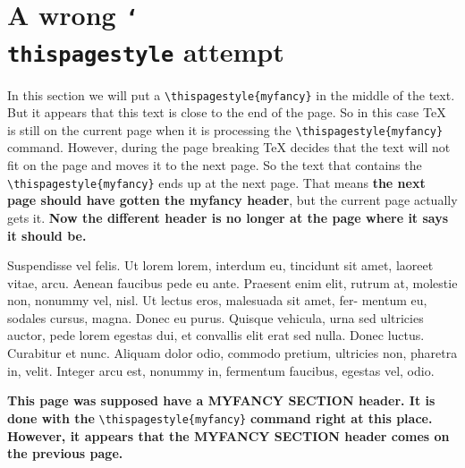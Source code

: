 \documentclass[openany]{book}
\newcommand{\cs}[1]{\texttt{\char`\\#1}}
\begin{document}
\bigskip

\lipsum[1-3]
\lipsum[3-5]

\newpage

\section{A wrong \cs{thispagestyle} attempt}

\begin{boxedminipage}{\textwidth}
In this section we will put a \verb|\thispagestyle{myfancy}| in the middle of the text. But it appears that this text is close to the end of the page. So in this case \TeX{} is still on the current page when it is processing the \verb|\thispagestyle{myfancy}| command. However, during the page breaking \TeX{} decides that the text will not fit on the page and moves it to the next page. So the text that contains the \verb|\thispagestyle{myfancy}| ends up at the next page. That means \textbf{the next page should have gotten the myfancy header}, but the current page actually gets it.  \textbf{Now the different header is no longer at the page where it says it should be.}
\end{boxedminipage}

\bigskip

\lipsum[6-8]

\bigskip
Suspendisse vel felis. Ut lorem lorem, interdum eu, tincidunt sit amet, laoreet vitae, arcu. Aenean faucibus pede eu ante. Praesent enim elit, rutrum at, molestie non, nonummy vel, nisl. Ut lectus eros, malesuada sit amet, fer- mentum eu, sodales cursus, magna. Donec eu purus. Quisque vehicula, urna sed ultricies auctor, pede lorem egestas dui, et convallis elit erat sed nulla. Donec luctus. Curabitur et nunc. Aliquam dolor odio, commodo pretium, ultricies non, pharetra in, velit. Integer arcu est, nonummy in, fermentum faucibus, egestas vel, odio.

\bigskip

\noindent
\begin{boxedminipage}{\textwidth}
\textbf{This page was supposed have a MYFANCY SECTION header. 
\thispagestyle{myfancy}
It is done with the} \verb|\thispagestyle{myfancy}| \textbf{command right at this place.
However, it appears that the MYFANCY SECTION header comes on the previous page.}
\end{boxedminipage}

\bigskip

\lipsum[8-9]

\newpage
\end{document}
